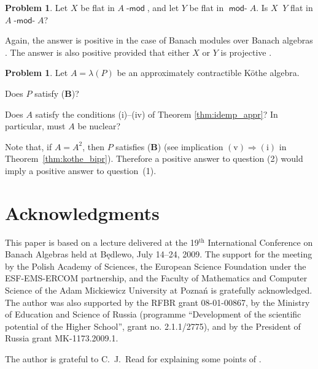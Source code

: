 \documentclass[12pt,reqno]{amsart}
\theoremstyle{definition}
\newtheorem{problem}[theorem]{Problem}
\begin{document}
\begin{problem}
Let $X$ be flat in $A{\mbox{-}\!\mathop{\mathsf{mod}}}$, and let
$Y$ be flat in ${\mathop{\mathsf{mod}}\!\mbox{-}} A$. Is $X{\mathop{\widehat\otimes}} Y$ flat in $A{\mbox{-}\!\mathop{\mathsf{mod}}\!\mbox{-}} A$?
\end{problem}

Again, the answer is positive in the case of Banach modules over Banach algebras
\cite[7.1.57]{X2}. The answer is also positive provided that either $X$ or $Y$
is projective \cite[Proposition 3.6]{Pir_msb}.

\begin{problem}
Let $A=\lambda(P)$ be an approximately contractible K\"othe algebra.
\begin{compactenum}
\item[(1)] Does $P$ satisfy ({\textbf{B}})?
\item[(2)] Does $A$ satisfy the conditions (i)--(iv) of Theorem \ref{thm:idemp_appr}?
In particular, must $A$ be nuclear?
\end{compactenum}
\end{problem}

Note that, if $A=A^2$, then $P$ satisfies ({\textbf{B}})
(see implication $\mathrm{(v)}\Longrightarrow\mathrm{(i)}$ in Theorem~\ref{thm:kothe_bipr}).
Therefore a positive answer to question (2) would imply a positive answer to question~(1).

\section*{Acknowledgments}
This paper is based on a lecture delivered at the 19$^\mathrm{th}$
International Conference on Banach Algebras held at
{\selectfont B\k{e}dlewo}, July 14--24,
2009. The support for the meeting by the Polish Academy of Sciences, the
European Science Foundation under the ESF-EMS-ERCOM partnership, and the
Faculty of Mathematics and Computer Science of the Adam Mickiewicz University
at Pozna\'n is gratefully acknowledged.
The author was also supported by the RFBR grant 08-01-00867,
by the Ministry of Education and Science of Russia (programme ``Development of the scientific
potential of the Higher School'', grant no. 2.1.1/2775),
and by the President of Russia grant MK-1173.2009.1.

The author is grateful to C.~J.~Read for explaining some points of \cite{LR}.
\end{document}
